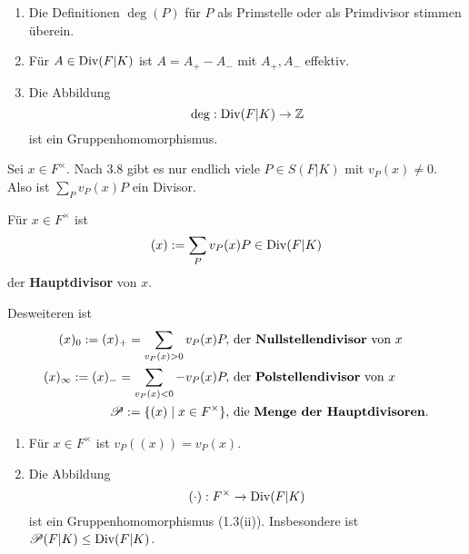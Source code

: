 \begin{bemerkungnr}
    \begin{enumerate}
        \item Die Definitionen $\deg(P)$ für $P$ als Primstelle oder als Primdivisor stimmen überein.
        \item Für $A \in \operatorname{Div}(F|K)$ ist $A = A_+ - A_-$ mit $A_+,A_-$ effektiv.
        \item Die Abbildung
        $$ \deg: \operatorname{Div}(F|K) \to \mathbb{Z}$$
        ist ein Gruppenhomomorphismus.
    \end{enumerate}
\end{bemerkungnr}

\begin{beispiel}
    
    Sei $x \in F^{\times}$. Nach 3.8 gibt es nur endlich viele $P \in S(F|K)$ mit $v_P(x) \ne 0$.
    Also ist $\sum\limits_P v_P(x) P$ ein Divisor.
\end{beispiel}

\begin{definition}
    Für $x \in F^{\times}$ ist
    $$ (x) := \sum\limits_P v_P(x) P \in \operatorname{Div}(F|K)$$
    der \textbf{Hauptdivisor} von $x$.

    Desweiteren ist
    \begin{align*}
        (x)_0 := (x)_+ = \sum\limits_{v_P(x) > 0} v_P(x) P, & \text{ der \textbf{Nullstellendivisor} von } x\\
        (x)_\infty := (x)_- = \sum\limits_{v_P(x) < 0} -v_P(x) P, & \text{ der \textbf{Polstellendivisor} von } x\\
        \mathscr{P} := \{(x) \mid x \in F^\times \}, & \text{ die \textbf{Menge der Hauptdivisoren}.}
    \end{align*}
\end{definition}

\begin{bemerkungnr}
    \begin{enumerate}
        \item Für $x \in F^{\times}$ ist $v_P((x)) = v_P(x)$.
        \item Die Abbildung
        $$ (\cdot): F^{\times} \to \operatorname{Div}(F|K)$$
        ist ein Gruppenhomomorphismus (1.3(ii)). 
        Insbesondere ist $\mathscr{P}(F|K) \leq \operatorname{Div}(F|K)$.
    \end{enumerate}
\end{bemerkungnr}

